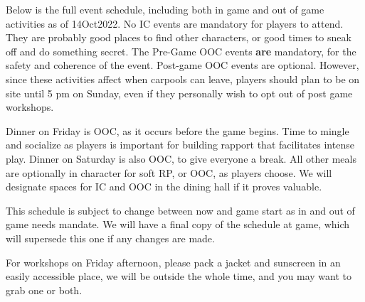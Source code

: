 \documentclass[green]{GL2020}
\begin{document}
\name{\gWeekendSchedule{}}

Below is the full event schedule, including both in game and out of game activities as of 14Oct2022. No IC events are mandatory for players to attend. They are probably good places to find other characters, or good times to sneak off and do something secret. The Pre-Game OOC events \textbf{are} mandatory, for the safety and coherence of the event. Post-game OOC events are optional. However, since these activities affect when carpools can leave, players should plan to be on site until 5 pm on Sunday, even if they personally wish to opt out of post game workshops.

Dinner on Friday is OOC, as it occurs before the game begins. Time to mingle and socialize as players is important for building rapport that facilitates intense play. Dinner on Saturday is also OOC, to give everyone a break. All other meals are optionally in character for soft RP, or OOC, as players choose. We will designate spaces for IC and OOC in the dining hall if it proves valuable.

This schedule is subject to change between now and game start as in and out of game needs mandate. We will have a final copy of the schedule at game, which will supersede this one if any changes are made.


For workshops on Friday afternoon, please pack a jacket and sunscreen in an easily accessible place, we will be outside the whole time, and you may want to grab one or both.
\end{document}
